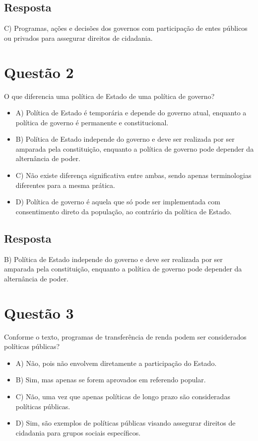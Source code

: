 \documentclass[
   article,       
   12pt,          
   oneside,       
   a4paper,       
   english,       
   brazil,        
   sumario=tradicional
   ]{abntex2}
\begin{document}
\subsection{Resposta}
C) Programas, ações e decisões dos governos com participação de entes públicos ou privados para assegurar direitos de cidadania.

\section{Questão 2}
O que diferencia uma política de Estado de uma política de governo?
\begin{itemize}
    \item {A) Política de Estado é temporária e depende do governo atual, enquanto a política de governo é permanente e constitucional.}
    \item {B) Política de Estado independe do governo e deve ser realizada por ser amparada pela constituição, enquanto a política de governo pode depender da alternância de poder.}
    \item {C) Não existe diferença significativa entre ambas, sendo apenas terminologias diferentes para a mesma prática.}
    \item {D) Política de governo é aquela que só pode ser implementada com consentimento direto da população, ao contrário da política de Estado.}
\end{itemize}

\subsection{Resposta}
B) Política de Estado independe do governo e deve ser realizada por ser amparada pela constituição, enquanto a política de governo pode depender da alternância de poder.

\section{Questão 3}
Conforme o texto, programas de transferência de renda podem ser considerados políticas públicas?
\begin{itemize}
    \item {A) Não, pois não envolvem diretamente a participação do Estado.}
    \item {B) Sim, mas apenas se forem aprovados em referendo popular.}
    \item {C) Não, uma vez que apenas políticas de longo prazo são consideradas políticas públicas.}
    \item {D) Sim, são exemplos de políticas públicas visando assegurar direitos de cidadania para grupos sociais específicos.}
\end{itemize}
\end{document}
